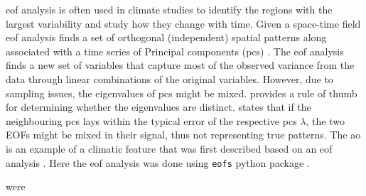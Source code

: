 \acrfull{eof} analysis is often used in climate studies to identify the regions with the largest variability and study how they change with time. 
Given a space-time field \acrshort{eof} analysis ﬁnds a set of orthogonal (independent) spatial patterns along associated with a time series of Principal components (\acrshort{pc}s) \parencite{hannachi2007empirical}. The \acrshort{eof} analysis ﬁnds a new set of variables that capture most of the observed variance from the data through linear combinations of the original variables. However, due to sampling issues, the eigenvalues of \acrshort{pc}s might be mixed. 
\textcite{north1982sampling} provides a rule of thumb for determining whether the eigenvalues are distinct. \textcite{north1982sampling} states that if the neighbouring \acrshort{pc}s lays within the typical error of the respective \acrshort{pc}s $\lambda$, the two EOFs might be mixed in their signal, thus not representing true patterns.
The \acrshort{ao} is an example of a climatic feature that was first described based on an \acrshort{eof} analysis \parencite{thompson1998arctic}. Here the \acrshort{eof} analysis was done using \verb|eofs| python package \parencite{dawson2016eofs}.  

were